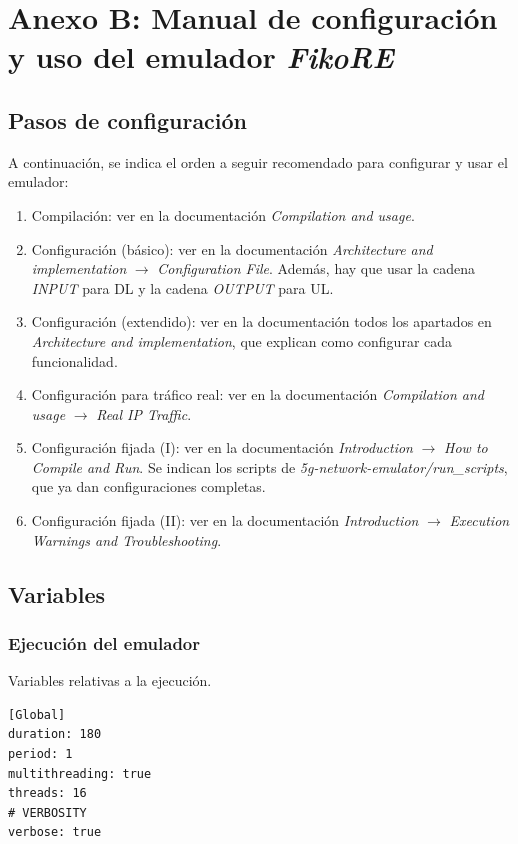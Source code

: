 \documentclass[12pt]{report} %
\begin{document}
\chapter* {Anexo B: Manual de configuración y uso del emulador \textit{FikoRE}}

\section* {Pasos de configuración}

A continuación, se indica el orden a seguir recomendado para configurar y usar el emulador:
\begin{enumerate}
\item Compilación: ver en la documentación \textit{Compilation and usage}.
\item Configuración (básico): ver en la documentación \textit{Architecture and implementation} $\rightarrow$ \textit{Configuration File}. Además, hay que usar la cadena \textit{INPUT} para DL y la cadena \textit{OUTPUT} para UL.
\item Configuración (extendido): ver en la documentación todos los apartados en \textit{Architecture and implementation}, que explican como configurar cada funcionalidad.
\item Configuración para tráfico real: ver en la documentación \textit{Compilation and usage} $\rightarrow$ \textit{Real IP Traffic}.
\item Configuración fijada (I): ver en la documentación \textit{Introduction} $\rightarrow$ \textit{How to Compile and Run}. Se indican los scripts de \textit{5g-network-emulator/run\_scripts}, que ya dan configuraciones completas.
\item Configuración fijada (II): ver en la documentación \textit{Introduction} $\rightarrow$ \textit{Execution Warnings and Troubleshooting}.
\end{enumerate}

\section* {Variables}

\subsection* {Ejecución del emulador}

Variables relativas a la ejecución.

\begin{lstlisting}
[Global]
duration: 180
period: 1
multithreading: true
threads: 16
# VERBOSITY
verbose: true
\end{lstlisting}
\end{document}
